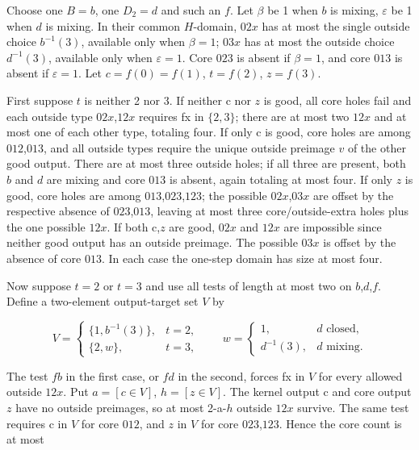 \documentclass[11pt]{article}
\theoremstyle{definition}
\theoremstyle{plain}
\begin{document}
Choose one \(B=b\), one \(D_{2}=d\) and such an \(f\). Let \(\beta\) be 1
when \(b\) is mixing, \(\varepsilon\) be 1 when \(d\) is mixing. In their common
\(H\)-domain, \(02x\) has at most the single outside choice
\(b^{-1}(3)\), available only when \(\beta=1\); \(03x\) has at most the
outside choice \(d^{-1}(3)\), available only when \(\varepsilon=1\). Core
\(023\) is absent if \(\beta=1\), and core \(013\) is absent if \(\varepsilon=1\).
Let \(c=f(0)=f(1)\), \(t=f(2)\), \(z=f(3)\).

First suppose \(t\) is neither 2 nor 3. If neither c nor \(z\) is good,
all core holes fail and each outside type \(02x\),\(12x\) requires fx in
\(\{2,3\}\); there are at most two \(12x\) and at most one of each other
type, totaling four. If only c is good, core holes are among \(012\),\(013\),
and all outside types require the unique outside preimage \(v\) of the
other good output. There are at most three outside holes; if all three
are present, both \(b\) and \(d\) are mixing and core \(013\) is absent,
again totaling at most four. If only \(z\) is good, core holes are among
\(013\),\(023\),\(123\); the possible \(02x\),\(03x\) are offset by the respective
absence of \(023\),\(013\), leaving at most three core/outside-extra holes plus
the one possible \(12x\). If both c,\(z\) are good, \(02x\) and \(12x\)
are impossible since neither good output has an outside preimage. The
possible \(03x\) is offset by the absence of core \(013\). In each case
the one-step domain has size at most four.

Now suppose \(t=2\) or \(t=3\) and use all tests of length at most two
on \(b\),\(d\),\(f\). Define a two-element output-target set \(V\)
by

\[
V=\begin{cases}\{1,b^{-1}(3)\},&t=2,\\\{2,w\},&t=3,\end{cases}\qquad w=\begin{cases}1,&d\text{ closed},\\d^{-1}(3),&d\text{ mixing}.\end{cases}
\]

The test \(fb\) in the first case, or \(fd\) in the second, forces fx in \(V\)
for every allowed outside \(12x\). Put \(a=[c\in V]\),
\(h=[z\in V]\). The kernel output c and core output \(z\)
have no outside preimages, so at most 2-a-\(h\) outside \(12x\)
survive. The same test requires c in \(V\) for core \(012\), and \(z\) in
\(V\) for core \(023\),\(123\). Hence the core count is at most
\end{document}
